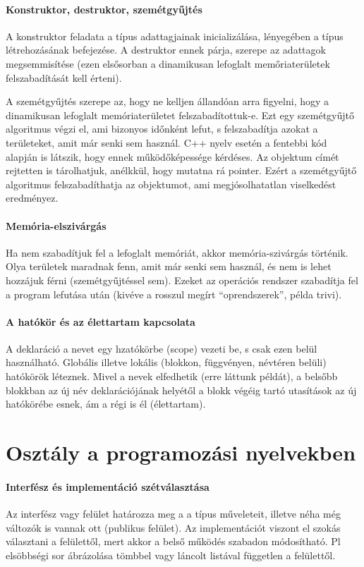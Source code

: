 \documentclass[fleqn,10pt,a4paper]{article}
\theoremstyle{magyar}
\begin{document}
  \paragraph{Konstruktor, destruktor, szemétgyűjtés}
  A konstruktor feladata a típus adattagjainak inicializálása,
  lényegében a típus létrehozásának befejezése. A destruktor ennek
  párja, szerepe az adattagok megsemmisítése (ezen elsősorban a
  dinamikusan lefoglalt memőriaterületek felszabadítását kell érteni).

  A szemétgyűjtés szerepe az, hogy ne kelljen állandóan arra figyelni,
  hogy a dinamikusan lefoglalt memóriaterületet
  felszabadítottuk-e. Ezt egy szemétgyűjtő algoritmus végzi el, ami
  bizonyos időnként lefut, s felszabadítja azokat a területeket, amit
  már senki sem használ. C++ nyelv esetén a fentebbi kód alapján is
  látszik, hogy  ennek működőképessége kérdéses. Az objektum címét
  rejtetten is tárolhatjuk, anélkkül, hogy mutatna rá pointer. Ezért a
  szemétgyűjtő algoritmus felszabadíthatja az objektumot, ami
  megjósolhatatlan viselkedést eredményez.

  \paragraph{Memória-elszivárgás}
  Ha nem szabadítjuk fel a lefoglalt memóriát, akkor
  memória-szivárgás történik. Olya területek maradnak fenn, amit már
  senki sem használ, és nem is lehet hozzájuk férni (szemétgyűjtéssel
  sem). Ezeket az  operációs rendszer szabadítja fel a program
  lefutása után (kivéve a rosszul megírt ``oprendszerek'', példa
  trivi).

  \paragraph{A hatókör és az élettartam kapcsolata}
  A deklaráció a nevet egy hzatókörbe (scope) vezeti be, s csak ezen
  belül használható. Globális illetve lokális (blokkon, függvényen,
  névtéren belüli) hatókörök léteznek. Mivel a nevek elfedhetik (erre
  láttunk példát), a belsőbb blokkban az új név deklarációjának
  helyétől a blokk végéig tartó utasítások az új hatókörébe esnek, ám
  a régi is él (élettartam).
  
  \newpage
  \section{Osztály a programozási nyelvekben}
  \paragraph{Interfész és implementáció szétválasztása}
  Az interfész vagy felület határozza meg a a típus műveleteit,
  illetve néha még változók is vannak ott (publikus felület). Az
  implementációt viszont el szokás választani a felülettől, mert akkor
  a belső működés szabadon módosítható. Pl elsöbbségi sor ábrázolása
  tömbbel vagy láncolt listával független a felülettől.
  
\end{document}
